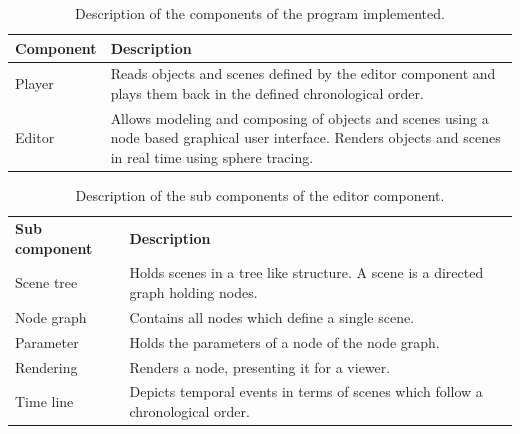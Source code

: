 \documentclass[%
    a4paper,    %
    justified,  %
    nobib,      %
    openany     %
]{tufte-book}
\makeatletter
\renewcommand{\label}[1]{\@tufte@label{##1}}%
\makeatother
\begin{document}
\begin{table}[h]
  \begin{tabularx}{\textwidth}{lX}
    \toprule
    \textbf{Component} & \textbf{Description} \\
    \midrule
    Player & Reads objects and scenes defined by the editor component and plays
    them back in the defined chronological order.\\
    Editor & Allows modeling and composing of objects and
    scenes using a node based graphical user interface. Renders objects
    and scenes in real time using sphere tracing. \\
    \bottomrule
  \end{tabularx}
  \caption{Description of the components of the program implemented.}
  \label{table:software-components}
\end{table}

\begin{table}[h]
  \begin{tabularx}{\textwidth}{lX}
    \toprule
    \textbf{Sub component} & \textbf{Description} \\
    Scene tree & Holds scenes in a tree like structure. A scene is a directed
    graph holding nodes.                                           \\
    Node graph & Contains all nodes which define a single scene.   \\
    Parameter  & Holds the parameters of a node of the node graph. \\
    Rendering  & Renders a node, presenting it for a viewer.       \\
    Time line  & Depicts temporal events in terms of scenes which follow a
    chronological order.                                           \\
    \bottomrule
  \end{tabularx}
  \caption{Description of the sub components of the editor component.}
  \label{table:editor:sub-components}
\end{table}
\end{document}
